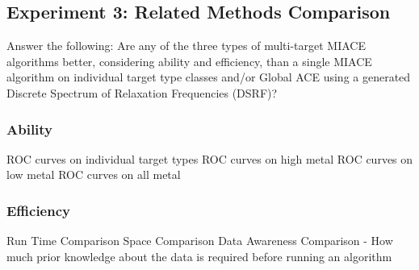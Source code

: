 \subsection{Experiment 3: Related Methods Comparison}
Answer the following: Are any of the three types of multi-target MIACE algorithms better, considering ability and efficiency, than a single MIACE algorithm on individual target type classes and/or Global ACE using a generated Discrete Spectrum of Relaxation Frequencies (DSRF)?

\subsubsection{Ability}
ROC curves on individual target types\newline
ROC curves on high metal \newline
ROC curves on low metal\newline
ROC curves on all metal

\subsubsection{Efficiency}
Run Time Comparison \newline
Space Comparison \newline
Data Awareness Comparison - How much prior knowledge about the data is required before running an algorithm\newline











